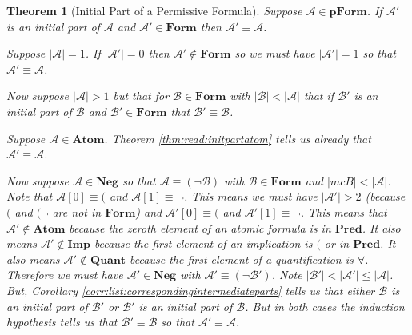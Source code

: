\documentclass[12pt]{article}
\theoremstyle{break}
\theoremstyle{break}
\newtheorem{theorem}{Theorem}[section]
\theoremstyle{break}
\theoremstyle{break}
\theoremstyle{break}
\newtheorem{informal definition}[definition]{Informal Definition}
\newcommand{\mc}[1]{\mathcal{#1}}
\begin{document}
\begin{theorem}[Initial Part of a Permissive Formula]
\label{thm:read:formnopropinitpart}
Suppose $\mc{A}\in\textbf{pForm}$.
If $\mc{A}'$ is an initial part of $\mc{A}$ and $\mc{A}'\in\textbf{Form}$ then $\mc{A}'\equiv \mc{A}$.

Suppose $|\mc{A}| = 1$.
If $|\mc{A}'| = 0$ then $\mc{A}'\not \in \textbf{Form}$ so we must have $|\mc{A}'| = 1$ so that $\mc{A}'\equiv \mc{A}$.

Now suppose $|\mc{A}|>1$ but that for $\mc{B}\in\textbf{Form}$ with $|\mc{B}| < |\mc{A}|$ that if $\mc{B}'$ is an initial part of $\mc{B}$ and $\mc{B}' \in \textbf{Form}$ that $\mc{B}'\equiv \mc{B}$.

Suppose $\mc{A}\in\textbf{Atom}$.
Theorem \ref{thm:read:initpartatom} tells us already that $\mc{A}'\equiv \mc{A}$.

Now suppose $\mc{A}\in\textbf{Neg}$ so that $\mc{A}\equiv (\lnot \mc{B})$ with $\mc{B}\in\textbf{Form}$ and $|mc{B}|<|\mc{A}|$.
Note that $\mc{A}[0] \equiv ($ and $\mc{A}[1]\equiv \lnot$.
This means we must have $|\mc{A}'|>2$ (because $($ and $(\lnot$ are not in $\textbf{Form}$) and $\mc{A}'[0]\equiv ($ and $\mc{A}'[1]\equiv \lnot$.
This means that $\mc{A}'\not \in \textbf{Atom}$ because the zeroth element of an atomic formula is in $\textbf{Pred}$.
It also means $\mc{A}'\not\in \textbf{Imp}$ because the first element of an implication is $($ or in $\textbf{Pred}$.
It also means $\mc{A}' \not \in \textbf{Quant}$ because the first element of a quantification is $\forall$.
Therefore we must have $\mc{A}'\in\textbf{Neg}$ with $\mc{A}'\equiv (\lnot \mc{B}')$.
Note $|\mc{B}'|<|\mc{A}'|\le |\mc{A}|$.
But, Corollary \ref{corr:list:correspondingintermediateparts} tells us that either $\mc{B}$ is an initial part of $\mc{B}'$ or $\mc{B}'$ is an initial part of $\mc{B}$.
But in both cases the induction hypothesis tells us that $\mc{B}'\equiv \mc{B}$ so that $\mc{A}'\equiv \mc{A}$.


\end{theorem}
\end{document}

